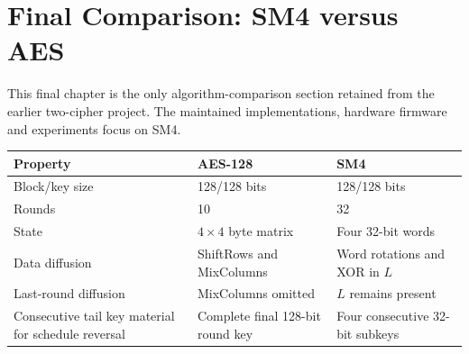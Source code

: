 \chapter{Final Comparison: SM4 versus AES}
This final chapter is the only algorithm-comparison section retained from the earlier two-cipher project. The maintained implementations, hardware firmware and experiments focus on SM4.
\begin{center}\begin{tabular}{P{.3\linewidth}P{.3\linewidth}P{.3\linewidth}}\toprule
Property & AES-128 & SM4\\\midrule
Block/key size & 128/128 bits & 128/128 bits\\
Rounds & 10 & 32\\
State & $4\times4$ byte matrix & Four 32-bit words\\
Data diffusion & ShiftRows and MixColumns & Word rotations and XOR in $L$\\
Last-round diffusion & MixColumns omitted & $L$ remains present\\
Consecutive tail key material for schedule reversal & Complete final 128-bit round key & Four consecutive 32-bit subkeys\\\bottomrule
\end{tabular}\end{center}
